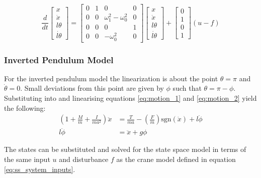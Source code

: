 \documentclass{article}
\begin{document}
\begin{equation}
  \frac{d}{dt} 
  \begin{bmatrix}
     x \\ \dot{x} \\ l\theta \\ \dot{l\theta} \end{bmatrix} = \begin{bmatrix} 
      0 & 1 & 0 & 0 \\ 0 & 0 & \omega_1^2 - \omega_0^2 & 0 \\ 0 & 0 & 0 & 1 \\ 0 & 0 & -\omega_0^2 & 0 \end{bmatrix} \begin{bmatrix} 
        x \\ \dot{x} \\ l\theta \\ \dot{l\theta} \end{bmatrix} + \begin{bmatrix} 
          0 \\ 1 \\ 0 \\ 1 \end{bmatrix} (u - f)
\end{equation}

\subsubsection{Inverted Pendulum Model}

For the inverted pendulum model the linearization is about the point $\theta = \pi$ and $\dot{\theta} = 0$.
Small deviations from this point are given by $\phi$ such that $\theta = \pi - \phi$.
Substituting into and linearising equations \ref{eq:motion_1} and \ref{eq:motion_2} yield the following:
\begin{align}
  \left( 1 + \frac{M}{m} + \frac{I}{ma^2} \right) \ddot{x} &= \frac{T}{ma} - \left(\frac{F}{m} \right)\text{sgn}(\dot{x}) + l \ddot{\phi} \\
  l \ddot{\phi} &= \ddot{x} + g\phi \label{eq:invp_motion_2}
\end{align}

The states can be substituted and solved for the state space model in terms of the same input $u$ and disturbance $f$ as the crane model defined in equation \ref{eq:ss_system_inputs}.
\end{document}
